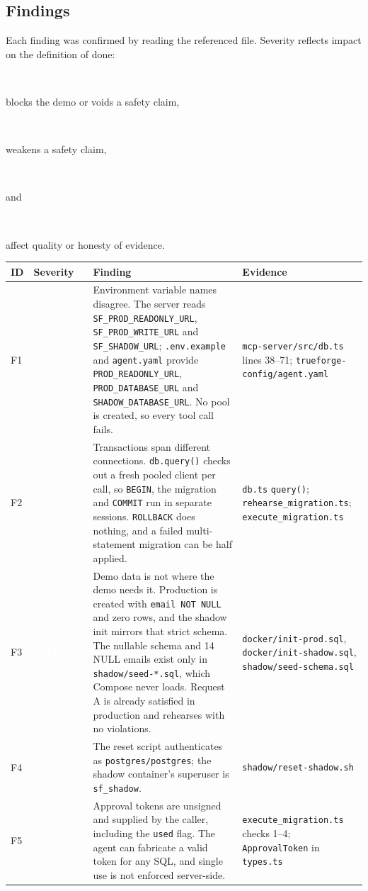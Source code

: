 \documentclass[11pt,a4paper]{article}
\newcommand{\fp}[1]{\nolinkurl{#1}}  %
\newcommand{\sev}[2]{\colorbox{#1}{\textcolor{white}{\sffamily\scriptsize\bfseries\strut #2}}}
\newcommand{\crit}{\sev{sfred}{CRITICAL}}
\newcommand{\high}{\sev{sforange}{HIGH}}
\newcommand{\med}{\sev{sfamber}{MEDIUM}}
\newcommand{\low}{\sev{sfgrey}{LOW}}
\begin{document}
\subsection{Findings}

Each finding was confirmed by reading the referenced file. Severity reflects impact on
the definition of done: \crit{} blocks the demo or voids a safety claim,
\high{} weakens a safety claim, \med{} and \low{} affect quality or honesty of evidence.

\begin{longtable}{@{}L{0.7cm}L{1.8cm}L{6.9cm}L{5.2cm}@{}}
\toprule
\sffamily\bfseries ID & \sffamily\bfseries Severity & \sffamily\bfseries Finding & \sffamily\bfseries Evidence \\
\midrule
\endhead
F1 & \crit & Environment variable names disagree. The server reads
  \fp{SF_PROD_READONLY_URL}, \fp{SF_PROD_WRITE_URL} and \fp{SF_SHADOW_URL}; \fp{.env.example} and
  \fp{agent.yaml} provide \fp{PROD_READONLY_URL}, \fp{PROD_DATABASE_URL} and \fp{SHADOW_DATABASE_URL}.
  No pool is created, so every tool call fails. & \fp{mcp-server/src/db.ts} lines 38--71;
  \fp{trueforge-config/agent.yaml} \\
F2 & \crit & Transactions span different connections. \fp{db.query()} checks out a fresh
  pooled client per call, so \texttt{BEGIN}, the migration and \texttt{COMMIT} run in separate
  sessions. \texttt{ROLLBACK} does nothing, and a failed multi-statement migration can be half applied.
  & \fp{db.ts} \fp{query()}; \fp{rehearse_migration.ts}; \fp{execute_migration.ts} \\
F3 & \crit & Demo data is not where the demo needs it. Production is created with
  \texttt{email NOT NULL} and zero rows, and the shadow init mirrors that strict schema. The nullable
  schema and 14 NULL emails exist only in \fp{shadow/seed-*.sql}, which Compose never loads.
  Request A is already satisfied in production and rehearses with no violations.
  & \fp{docker/init-prod.sql}, \fp{docker/init-shadow.sql}, \fp{shadow/seed-schema.sql} \\
F4 & \high & The reset script authenticates as \texttt{postgres/postgres}; the shadow container's
  superuser is \fp{sf_shadow}. & \fp{shadow/reset-shadow.sh} \\
F5 & \crit & Approval tokens are unsigned and supplied by the caller, including the
  \fp{used} flag. The agent can fabricate a valid token for any SQL, and single use is
  not enforced server-side. & \fp{execute_migration.ts} checks 1--4; \fp{ApprovalToken} in \fp{types.ts} \\

\end{longtable}
\end{document}
